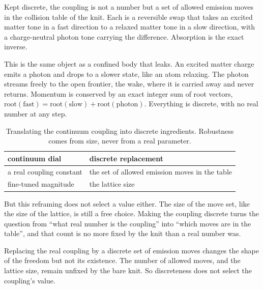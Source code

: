 \begin{definition}
Kept discrete, the coupling is not a number but a set of allowed emission moves in the collision table of the knit. Each is a reversible swap that takes an excited matter tone in a fast direction to a relaxed matter tone in a slow direction, with a charge-neutral photon tone carrying the difference. Absorption is the exact inverse.
\end{definition}

This is the same object as a confined body that leaks. An excited matter charge emits a photon and drops to a slower state, like an atom relaxing. The photon streams freely to the open frontier, the wake, where it is carried away and never returns. Momentum is conserved by an exact integer sum of root vectors, $\mathrm{root}(\text{fast}) = \mathrm{root}(\text{slow}) + \mathrm{root}(\text{photon})$. Everything is discrete, with no real number at any step.

\begin{table}[ht]
\centering
\begin{tabular}{@{}ll@{}}
\toprule
continuum dial & discrete replacement \\
\midrule
a real coupling constant & the set of allowed emission moves in the table \\
fine-tuned magnitude & the lattice size \\
\bottomrule
\end{tabular}
\caption{Translating the continuum coupling into discrete ingredients. Robustness comes from size, never from a real parameter.}
\label{tab:discrete-coupling}
\end{table}

But this reframing does not select a value either. The size of the move set, like the size of the lattice, is still a free choice. Making the coupling discrete turns the question from ``what real number is the coupling'' into ``which moves are in the table'', and that count is no more fixed by the knit than a real number was.

\begin{result}
Replacing the real coupling by a discrete set of emission moves changes the shape of the freedom but not its existence. The number of allowed moves, and the lattice size, remain unfixed by the bare knit. So discreteness does not select the coupling's value.
\end{result}

